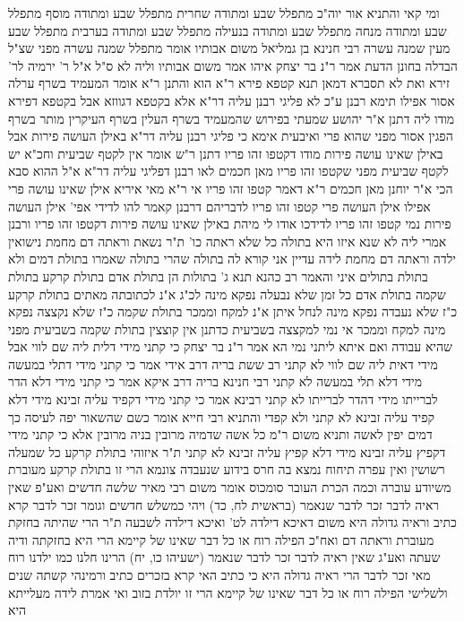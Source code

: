 \documentclass[12pt, openany]{book}
\begin{document}
{ומי קאי  והתניא  אור יוה"כ מתפלל שבע ומתודה שחרית מתפלל שבע ומתודה מוסף מתפלל שבע ומתודה מנחה מתפלל שבע ומתודה בנעילה מתפלל שבע ומתודה בערבית מתפלל שבע מעין שמנה עשרה 
רבי חנינא בן גמליאל משום אבותיו אומר  מתפלל שמנה עשרה מפני שצ"ל הבדלה בחונן הדעת  אמר ר"נ בר יצחק  איהו אמר משום אבותיו וליה לא ס"ל 
א"ל ר' ירמיה לר' זירא  ואת לא תסברא דמאן תנא קטפא פירא ר"א הוא  והתנן ר"א אומר  המעמיד בשרף ערלה אסור 
אפילו תימא רבנן ע"כ לא פליגי רבנן עליה דר"א אלא בקטפא דגווזא אבל בקטפא דפירא מודו ליה  דתנן א"ר יהושע  שמעתי בפירוש שהמעמיד בשרף העלין בשרף העיקרין מותר בשרף הפגין אסור מפני שהוא פרי 
ואיבעית אימא  כי פליגי רבנן עליה דר"א באילן העושה פירות אבל באילן שאינו עושה פירות מודו דקטפו זהו פריו  דתנן ר"ש אומר  אין לקטף שביעית וחכ"א  יש לקטף שביעית מפני שקטפו זהו פריו 
מאן חכמים  לאו רבנן דפליגי עליה דר"א  א"ל ההוא סבא הכי א"ר יוחנן  מאן חכמים ר"א דאמר קטפו זהו פריו 
אי ר"א מאי איריא אילן שאינו עושה פרי  אפילו אילן העושה פרי קטפו זהו פריו  לדבריהם דרבנן קאמר להו לדידי אפי' אילן העושה פירות נמי קטפו זהו פריו לדידכו אודו לי מיהת באילן שאינו עושה פירות דקטפו זהו פריו ורבנן אמרי  ליה לא שנא
איזו היא בתולה כל שלא ראתה כו'  ת"ר  נשאת וראתה דם מחמת נישואין ילדה וראתה דם מחמת לידה עדיין אני קורא לה בתולה שהרי בתולה שאמרו בתולת דמים ולא בתולת בתולים 
איני והאמר רב כהנא תנא ג' בתולות הן  בתולת אדם בתולת קרקע בתולת שקמה  בתולת אדם כל זמן שלא נבעלה נפקא מינה לכ"ג א"נ לכתובתה מאתים 
בתולת קרקע כ"ז שלא נעבדה נפקא מינה לנחל איתן א"נ למקח וממכר 
בתולת שקמה כ"ז שלא נקצצה נפקא מינה למקח וממכר אי נמי למקצצה בשביעית כדתנן  אין קוצצין בתולת שקמה בשביעית מפני שהיא עבודה  ואם איתא ליתני נמי הא 
אמר ר"נ בר יצחק  כי קתני מידי דלית ליה שם לווי אבל מידי דאית ליה שם לווי לא קתני  רב ששת בריה דרב אידי אמר  כי קתני מידי דתלי במעשה מידי דלא תלי במעשה לא קתני 
רבי חנינא בריה דרב איקא אמר  כי קתני מידי דלא הדר לברייתו מידי דהדר לברייתו לא קתני  רבינא אמר  כי קתני מידי דקפיד עליה זבינא מידי דלא קפיד עליה זבינא לא קתני 
ולא קפדי  והתניא רבי חייא אומר  כשם שהשאור יפה לעיסה כך דמים יפין לאשה ותניא משום ר"מ  כל אשה שדמיה מרובין בניה מרובין  אלא  כי קתני מידי דקפיץ עליה זבינא מידי דלא קפיץ עליה זבינא לא קתני 
ת"ר  איזוהי בתולת קרקע כל שמעלה רשושין ואין עפרה תיחוח נמצא בה חרס בידוע שנעבדה צונמא הרי זו בתולת קרקע
מעוברת משיודע עוברה וכמה הכרת העובר  סומכוס אומר משום רבי מאיר  שלשה חדשים  ואע"פ שאין ראיה לדבר זכר לדבר שנאמר  (בראשית לח, כד) ויהי כמשלש חדשים וגומר 
זכר לדבר  קרא כתיב וראיה גדולה היא  משום דאיכא דילדה לט' ואיכא דילדה לשבעה 
ת"ר  הרי שהיתה בחזקת מעוברת וראתה דם ואח"כ הפילה רוח או כל דבר שאינו של קיימא הרי היא בחזקתה ודיה שעתה 
ואע"ג שאין ראיה לדבר זכר לדבר שנאמר  (ישעיהו כו, יח) הרינו חלנו כמו ילדנו רוח  מאי זכר לדבר  הרי ראיה גדולה היא  כי כתיב האי קרא בזכרים כתיב
ורמינהי  קשתה שנים ולשלישי הפילה רוח או כל דבר שאינו של קיימא הרי זו יולדת בזוב  ואי אמרת לידה מעלייתא היא}
\end{document}
